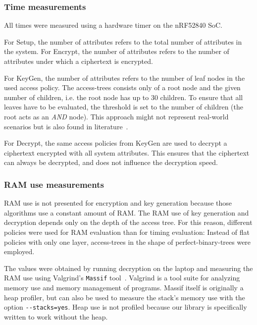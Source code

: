 \subsubsection{Time measurements}


All times were measured using a hardware timer on the nRF52840 SoC.

For Setup, the number of attributes refers to the total number of attributes in the system.
For Encrypt, the number of attributes refers to the number of attributes under which a ciphertext is encrypted.

For KeyGen, the number of attributes refers to the number of leaf nodes in the used access policy.
The \glspl{access-tree} consists only of a root node and the given number of children, i.e. the root node has up to 30 children. 
To ensure that all leaves have to be evaluated, the threshold is set to the number of children (the root acts as an \emph{AND} node).
This approach might not represent real-world scenarios but is also found in literature~\cite{girgenti_feasibility_2019}.

For Decrypt, the same access policies from KeyGen are used to decrypt a ciphertext encrypted with all system attributes.
This ensures that the ciphertext can always be decrypted, and does not influence the decryption speed.

\subsubsection{RAM use measurements}


RAM use is not presented for encryption and key generation because those algorithms use a constant amount of RAM.
The RAM use of key generation and decryption depends only on the depth of the access tree.
For this reason, different policies were used for RAM evaluation than for timing evaluation:
Instead of flat policies with only one layer, \glspl{access-tree}  in the shape of \glspl{perfect-binary-tree} were employed.

The values were obtained by running decryption on the laptop and measuring the RAM use using Valgrind's \texttt{Massif} tool~\cite{nethercote_massif_nodate}.
Valgrind is a tool suite for analyzing memory use and memory management of programs.
Massif itself is originally a heap profiler, but can also be used to measure the stack's memory use with the option \verb+--stacks=yes+.
Heap use is not profiled because our library is specifically written to work without the heap.


